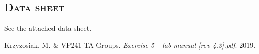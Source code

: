 \documentclass[a4paper,12pt]{article}
\begin{document}
\begin{appendices}
\section{\textsc{Data sheet}} 
See the attached data sheet.
\end{appendices} 


\begin{thebibliography}{9}
 Krzyzosiak, M. \& VP241 TA Groups.
\textit{Exercise 5 - lab manual [rev 4.3].pdf}. 
2019.
\end{thebibliography}


\end{document}
